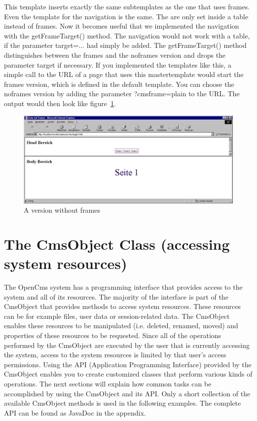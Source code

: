 This template inserts exactly the same subtemplates as the one that uses frames. Even the
template for the navigation is the same. The are only set inside a table instead of frames.
Now it becomes useful that we implemented the navigation with the {\meth getFrameTarget()} 
method.
The navigation would not work with a table, if the parameter {\tag target=...} had
simply be added. The {\meth getFrameTarget()} method distinguishes between the frames and
the noframes version and drops the parameter {\name target} if necessary. 
If you implemented the templates like this, a simple call to the URL of a page that 
uses this mastertemplate would start the frames version, which is defined in
the default template. 
You can choose the noframes version by adding the parameter {\name ?cmsframe=plain}
to the URL. The output would then look like figure~\ref{noFrames}.

\begin{figure}[hbt]
\begin{center}
\includegraphics[width=\sgw]
                   {pics/templateMech/frames_2}
\caption[A version without frames]
           {A version without frames}
\label{noFrames}
\end{center}
\end{figure}

\section{The CmsObject Class (accessing system resources)}

The OpenCms system has a programming interface that provides access to the
system and all of its resources. The majority of the interface is part
of the {\name CmsObject} that provides methods to access system resources.
These resources can be for example files, user data or session-related
data. The {\name CmsObject} enables these resources to be manipulated (i.e.
deleted, renamed, moved) and properties of these resources to be
requested. Since all of the operations performed by the {\name CmsObject} are
executed by the user that is currently accessing the system, access to
the system resources is limited by that user's access permissions.
Using the API (Application Programming Interface) provided by the
{\name CmsObject} enables you to create customized classes that perform various
kinds of operations.
The next sections will explain how common tasks can be accomplished by
using the {\name CmsObject} and its API. Only a short collection of the
available {\name CmsObject} methods is used in the following examples. The
complete API can be found as JavaDoc in the appendix.

